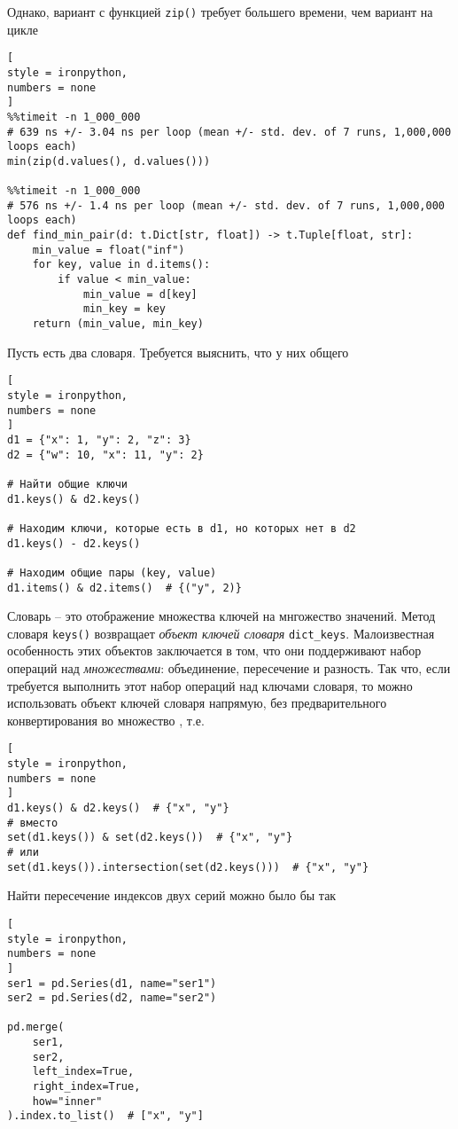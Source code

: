 \documentclass[%
	11pt,
	a4paper,
	utf8,
		]{article}
\begin{document}
Однако, вариант с функцией \texttt{zip()} требует большего времени, чем вариант на цикле
\begin{lstlisting}[
style = ironpython,
numbers = none
]
%%timeit -n 1_000_000
# 639 ns +/- 3.04 ns per loop (mean +/- std. dev. of 7 runs, 1,000,000 loops each)
min(zip(d.values(), d.values()))  

%%timeit -n 1_000_000
# 576 ns +/- 1.4 ns per loop (mean +/- std. dev. of 7 runs, 1,000,000 loops each)
def find_min_pair(d: t.Dict[str, float]) -> t.Tuple[float, str]:
    min_value = float("inf")
    for key, value in d.items():
        if value < min_value:
            min_value = d[key]
            min_key = key
    return (min_value, min_key)
\end{lstlisting} 

Пусть есть два словаря. Требуется выяснить, что у них общего
\begin{lstlisting}[
style = ironpython,
numbers = none
]
d1 = {"x": 1, "y": 2, "z": 3}
d2 = {"w": 10, "x": 11, "y": 2}

# Найти общие ключи
d1.keys() & d2.keys()

# Находим ключи, которые есть в d1, но которых нет в d2
d1.keys() - d2.keys()

# Находим общие пары (key, value)
d1.items() & d2.items()  # {("y", 2)}
\end{lstlisting}

Словарь -- это отображение множества ключей на мнгожество значений. Метод словаря \texttt{keys()} возвращает \emph{объект ключей словаря} \texttt{dict\_keys}. Малоизвестная особенность этих объектов заключается в том, что они поддерживают набор операций над \emph{множествами}: объединение, пересечение и разность. Так что, если требуется выполнить этот набор операций над ключами словаря, то можно использовать объект ключей словаря напрямую, без предварительного конвертирования во множество \cite[]{beazley:python_cookbook-2019}, т.е.
\begin{lstlisting}[
style = ironpython,
numbers = none
]
d1.keys() & d2.keys()  # {"x", "y"}
# вместо
set(d1.keys()) & set(d2.keys())  # {"x", "y"}
# или
set(d1.keys()).intersection(set(d2.keys()))  # {"x", "y"}
\end{lstlisting}

Найти пересечение индексов двух серий можно было бы так
\begin{lstlisting}[
style = ironpython,
numbers = none
]
ser1 = pd.Series(d1, name="ser1")
ser2 = pd.Series(d2, name="ser2")

pd.merge(
    ser1,
    ser2,
    left_index=True,
    right_index=True,
    how="inner"
).index.to_list()  # ["x", "y"]
\end{lstlisting}
\end{document}
